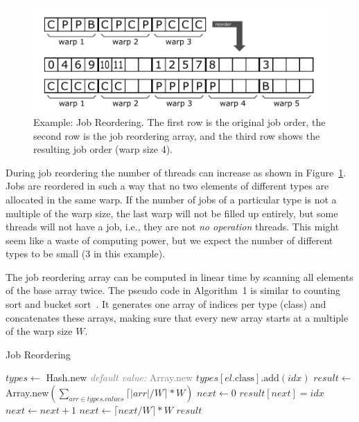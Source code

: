 \documentclass[preprint]{sigplanconf}
\begin{document}
\begin{figure}[!htp]
    \centering
    \includegraphics[width=\columnwidth]{reorder_example.pdf}
    \caption{Example: Job Reordering. The first row is the original job order, the second row is the job reordering array, and the third row shows the resulting job order (warp size 4).}
    \label{fig:ex_job_reorder}
\end{figure}

During job reordering the number of threads can increase as shown in Figure~\ref{fig:ex_job_reorder}. Jobs are reordered in such a way that no two elements of different types are allocated in the same warp. If the number of jobs of a particular type is not a multiple of the warp size, the last warp will not be filled up entirely, but some threads will not have a job, i.e., they are not \emph{no operation} threads. This might seem like a waste of computing power, but we expect the number of different types to be small (3 in this example).

The job reordering array can be computed in linear time by scanning all elements of the base array twice. The pseudo code in Algorithm~1 is similar to counting sort and bucket sort~\cite{Corwin:2004:SLT:1040231.1040257}. It generates one array of indices per type (class) and concatenates these arrays, making sure that every new array starts at a multiple of the warp size $W$.

\begin{algorithm}
\caption{Job Reordering}
\label{CHalgorithm}
\begin{algorithmic}[1]
\State $\mathit{types} \gets$ Hash.new \hfill \textcolor{gray}{\textit{default value:} Array.new}
    \State $\mathit{types}[\mathit{el}.\mbox{class}].\mbox{add}(\mathit{idx})$
\EndFor
\State $\mathit{result} \gets$ Array.new$(\sum_{\mathit{arr} \in \mathit{types}.\mathit{values}} \lceil |\mathit{arr}| / W \rceil * W)$
\State $\mathit{next} \gets 0$
        \State $\mathit{result}[\mathit{next}] = \mathit{idx}$
        \State $\mathit{next} \gets \mathit{next} + 1$
    \EndFor
    \State $\mathit{next} \gets \lceil \mathit{next} / W \rceil * W$
\EndFor
\State \Return $\mathit{result}$
\EndProcedure
\end{algorithmic}
\end{algorithm}
\end{document}
